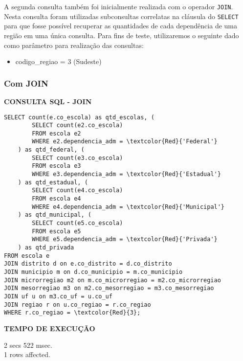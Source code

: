 \documentclass[12pt,a4paper]{article}
\begin{document}
A segunda consulta também foi inicialmente realizada com o operador \texttt{JOIN}. Nesta consulta foram utilizadas subconsultas correlatas na cláusula do \texttt{SELECT} para que fosse possível recuperar as quantidades de cada dependência de uma região em uma única consulta. Para fins de teste, utilizaremos o seguinte dado como parâmetro para realização das consultas: 
\begin{itemize}
    \item codigo\_regiao = 3 (Sudeste)
\end{itemize}

\subsubsection{Com JOIN}

\vspace{0.5cm}
\begin{flushleft}
\textbf{CONSULTA SQL - JOIN}\\
\end{flushleft}

\begin{Verbatim}[commandchars=\\\{\}]
SELECT count(e.co_escola) as qtd_escolas, (
        SELECT count(e2.co_escola)
        FROM escola e2
        WHERE e2.dependencia_adm = \textcolor{Red}{'Federal'}
    ) as qtd_federal, (
        SELECT count(e3.co_escola)
        FROM escola e3
        WHERE e3.dependencia_adm = \textcolor{Red}{'Estadual'}
    ) as qtd_estadual, (
        SELECT count(e4.co_escola)
        FROM escola e4
        WHERE e4.dependencia_adm = \textcolor{Red}{'Municipal'}
    ) as qtd_municipal, (
        SELECT count(e5.co_escola)
        FROM escola e5
        WHERE e5.dependencia_adm = \textcolor{Red}{'Privada'}
    ) as qtd_privada
FROM escola e
JOIN distrito d on e.co_distrito = d.co_distrito
JOIN municipio m on d.co_municipio = m.co_municipio
JOIN microrregiao m2 on m.co_microrregiao = m2.co_microrregiao
JOIN mesorregiao m3 on m2.co_mesorregiao = m3.co_mesorregiao
JOIN uf u on m3.co_uf = u.co_uf
JOIN regiao r on u.co_regiao = r.co_regiao
WHERE r.co_regiao = \textcolor{Red}{3};
\end{Verbatim}

\begin{flushleft}
\textbf{TEMPO DE EXECUÇÃO}\\
\end{flushleft}
2 secs 522 msec.\\
1 rows affected.\\
\end{document}
